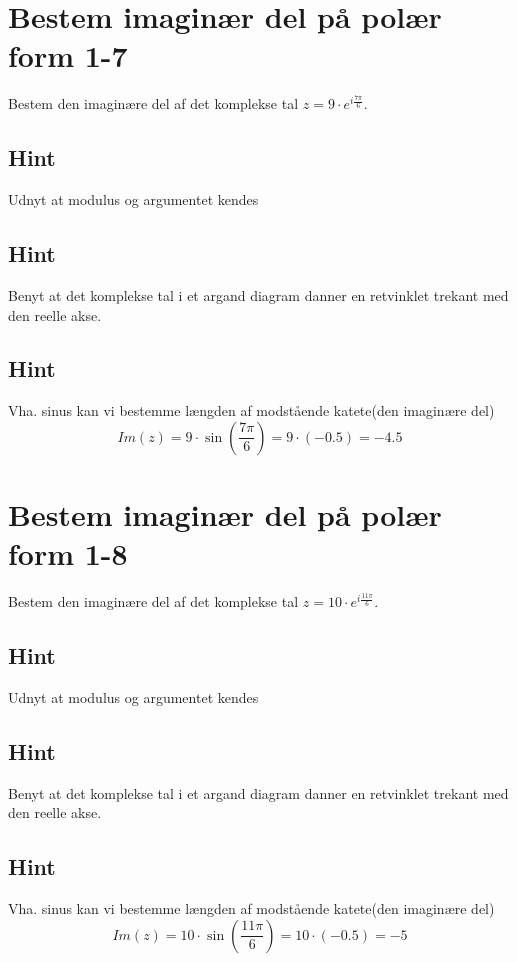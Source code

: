 \documentclass{article}
\newenvironment{exercise}[1]{\newpage\section{#1}}{}
\newcommand{\answerbox}[1]{\fbox{$#1$}}
\newcommand{\hint}{\subsection*{Hint}}
\begin{document}
\newpage

\begin{exercise}{Bestem imaginær del på polær form 1-7}
	
	Bestem den imaginære del af det komplekse tal $z=9 \cdot e^{i \frac{7 \pi}{6}}$.
	
	\answerbox{-4.5}
	
	
	\hint 
	
	Udnyt at modulus og argumentet kendes
	
	
	\hint
	
	Benyt at det komplekse tal i et argand diagram danner en retvinklet trekant med den reelle akse. 
	
	\hint 
	
	Vha. sinus kan vi bestemme længden af modstående katete(den imaginære del)
	\[
	Im(z) =  9 \cdot \sin\left(\frac{7 \pi}{6}\right) = 9 \cdot (-0.5) = -4.5
	\]
	
\end{exercise}

\newpage

\begin{exercise}{Bestem imaginær del på polær form 1-8}
	
	Bestem den imaginære del af det komplekse tal $z=10 \cdot e^{i \frac{11 \pi}{6}}$.
	
	\answerbox{-5}
	
	
	\hint 
	
	Udnyt at modulus og argumentet kendes
	
	
	\hint
	
	Benyt at det komplekse tal i et argand diagram danner en retvinklet trekant med den reelle akse. 
	
	\hint 
	
	Vha. sinus kan vi bestemme længden af modstående katete(den imaginære del)
	\[
	Im(z) =  10 \cdot \sin\left(\frac{11 \pi}{6}\right) = 10 \cdot (-0.5)= -5
	\]
	
\end{exercise}
\end{document}
